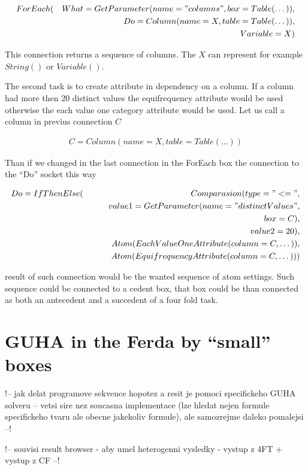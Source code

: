 \documentclass[a4paper,12pt]{book}
\begin{document}
\begin{eqnarray*}
ForEach(&&What=GetParameter(name="columns", box=Table(\dots)), \\&& Do=Column(name=X, table=Table(\dots)), \\&& Variable=X)
\end{eqnarray*}

This connection returns a sequence of columns. The $X$ can represent for example $String()$ or $Variable()$.

The second task is to create attribute in dependency on a column. If a column had more then 20 distinct values the equifrequency attribute would be used otherwise the each value one category attribute would be used. Let us call a column in previus connection $C$

\begin{eqnarray*}
C=Column(name=X, table=Table(\dots))
\end{eqnarray*}

Than if we changed in the last connection in the ForEach box the connection to the ``Do'' socket this way

\begin{eqnarray*}
Do=IfThenElse(&&Comparasion(type="<=", \\&&\qquad value1=GetParameter(name="distinctValues", \\&&\qquad\qquad box=C), \\&&\qquad value2=20),\\&&Atom(EachValueOneAttribute(column=C,\dots)),\\&&Atom(EquifrequencyAttribute(column=C,\dots)))
\end{eqnarray*}

result of such connection would be the wanted sequence of atom settings. Such sequence could be connected to a cedent box, that box could be than connected as both an antecedent and a succedent of a four fold task.

\section{GUHA in the Ferda by ``small'' boxes}
!-- jak delat programove sekvence hopotez a resit je pomoci specifickeho GUHA solveru -- vetsi sire nez soucasna implementace (lze hledat nejen formule specifickeho tvaru ale obecne jakekoliv formule), ale samozrejme daleko pomalejsi --!

!-- souvisi result browser - aby umel heterogenni vysledky - vystup z 4FT + vystup z CF --!
\end{document}
